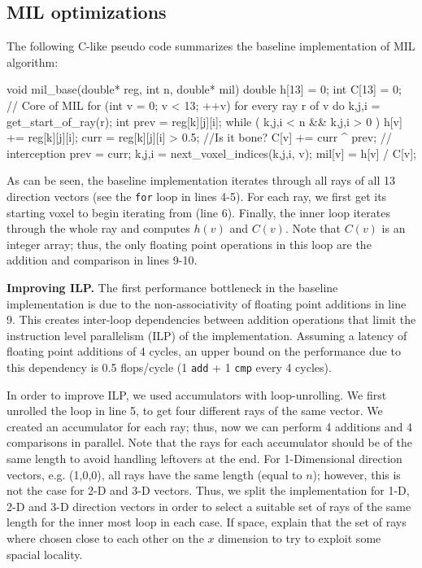 \documentclass[letterpaper]{article}
\newcommand{\mypar}[1]{{\bf #1.}}
\begin{document}
\subsection{MIL optimizations}
The following C-like pseudo code summarizes the baseline implementation of MIL algorithm:

\begin{ccode}[caption={My Caption},captionpos=b]
void mil_base(double* reg, int n, double* mil){
  double h[13] = 0; int C[13] = 0;
  // Core of MIL
  for (int v = 0; v < 13; ++v)
    for every ray r of v  do
      {k,j,i} = get_start_of_ray(r);
      int prev = reg[k][j][i];
      while ( {k,j,i} < n && {k,j,i} > 0 )
        h[v] += reg[k][j][i];
        curr = reg[k][j][i] > 0.5; //Is it bone?
        C[v] += curr ^ prev; // interception
        prev = curr;
        {k,j,i} = next_voxel_indices({k,j,i}, v);
    mil[v] = h[v] / C[v];
 }
\end{ccode}
As can be seen, the baseline implementation iterates through all rays of all 13 direction vectors (see the \texttt{for} loop in lines 4-5). For each ray, we first get its starting voxel to begin iterating from (line 6). Finally, the inner loop iterates through the whole ray and computes $h(v)$ and $C(v)$. Note that $C(v)$ is an integer array; thus, the only floating point operations in this loop are the addition and comparison in lines 9-10.

\mypar{Improving ILP}
The first performance bottleneck in the baseline implementation is due to the non-associativity of floating point additions in line 9. This creates inter-loop dependencies between addition operations that limit the instruction level parallelism (ILP) of the implementation. Assuming a latency of floating point additions of 4 cycles, an upper bound on the performance due to this dependency is 0.5 flops/cycle (1 \texttt{add} + 1 \texttt{cmp} every 4 cycles).

In order to improve ILP, we used accumulators with loop-unrolling. We first unrolled the loop in line 5, to get four different rays of the same vector. We created an accumulator for each ray; thus, now we can perform 4 additions and 4 comparisons in parallel. Note that the rays for each accumulator should be of the same length to avoid handling leftovers at the end. For 1-Dimensional direction vectors, e.g. (1,0,0), all rays have the same length (equal to $n$); however, this is not the case for 2-D and 3-D vectors. Thus, we split the implementation for 1-D, 2-D and 3-D direction vectors in order to select a suitable set of rays of the same length for the inner most loop in each case.
{\color{red} If space, explain that the set of rays where chosen close to each other on the $x$ dimension to try to exploit some spacial locality.}
\end{document}
